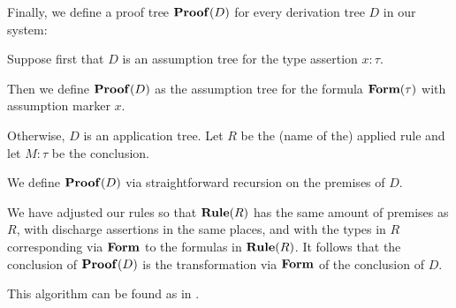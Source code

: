 \begin{algorithm}
\begin{thmenum}
     Finally, we define a proof tree \( \op*{Proof}(D) \) for every derivation tree \( D \) in our system:
    \begin{thmenum}
       Suppose first that \( D \) is an assumption tree for the type assertion \( x: \tau \).

      Then we define \( \op*{Proof}(D) \) as the assumption tree for the formula \( \op*{Form}(\tau) \) with assumption marker \( x \).

       Otherwise, \( D \) is an application tree. Let \( R \) be the (name of the) applied rule and let \( M: \tau \) be the conclusion.

      We define \( \op*{Proof}(D) \) via straightforward recursion on the premises of \( D \).

      We have adjusted our rules so that \( \op*{Rule}(R) \) has the same amount of premises as \( R \), with discharge assertions in the same places, and with the types in \( R \) corresponding via \( \op*{Form} \) to the formulas in \( \op*{Rule}(R) \). It follows that the conclusion of \( \op*{Proof}(D) \) is the transformation via \( \op*{Form} \) of the conclusion of \( D \).
    \end{thmenum}
  \end{thmenum}
\end{algorithm}
\begin{comments}
  \item This algorithm can be found as  in \cite{notebook:code}.
\end{comments}

